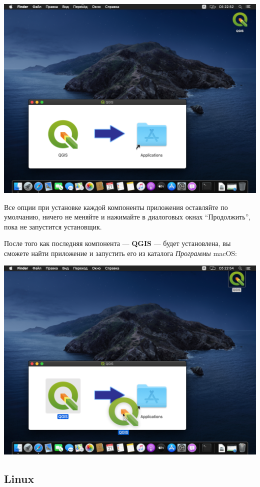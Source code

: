\documentclass[
  12pt,
]{book}
\begin{document}
\includegraphics{images/installation_instruction_mac/mac04.png}

Все опции при установке каждой компоненты приложения оставляйте по умолчанию, ничего не меняйте и нажимайте в диалоговых окнах ``Продолжить'', пока не запустится установщик.

После того как последняя компонента --- \textbf{QGIS} --- будет установлена, вы сможете найти приложение и запустить его из каталога \emph{Программы} macOS:

\includegraphics{images/installation_instruction_mac/mac05.png}

\hypertarget{linux}{%
\subsection*{Linux}\label{linux}}
\end{document}
